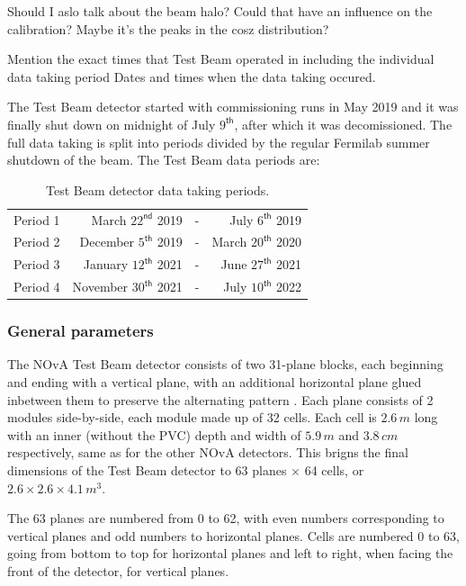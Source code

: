 \documentclass[12pt,a4paper]{article}
\begin{document}
Should I aslo talk about the beam halo? Could that have an influence on the calibration? Maybe it's the peaks in the cosz distribution?

Mention the exact times that Test Beam operated in including the individual data taking period
Dates and times when the data taking occured.

The Test Beam detector started with commissioning runs in May 2019 and it was finally shut down on midnight of July $9^{\textsf{th}}$, after which it was decomissioned. The full data taking is split into periods divided by the regular Fermilab summer shutdown of the beam. The Test Beam data periods are:
\begin{table}[!ht]
\centering
\def\arraystretch{1.4}
\begin{tabular}{l@{\hskip 1in}rcr}
Period 1 & March $22^{\textsf{nd}}$ 2019 & - & July $6^{\textsf{th}}$ 2019\\
Period 2 & December $5^{\textsf{th}}$ 2019 & - & March $20^{\textsf{th}}$ 2020\\
Period 3 & January $12^{\textsf{th}}$ 2021 & - & June $27^{\textsf{th}}$ 2021\\
Period 4 & November $30^{\textsf{th}}$ 2021 & - & July $10^{\textsf{th}}$ 2022
\end{tabular}
\caption{Test Beam detector data taking periods.}
\label{tabTestBeamPeriods}
\end{table}

\subsubsection*{General parameters}
The NOvA Test Beam detector consists of two 31-plane blocks, each beginning and ending with a vertical plane, with an additional horizontal plane glued inbetween them to preserve the alternating pattern \cite{NOVA-doc-29543}. Each plane consists of 2 modules side-by-side, each module made up of 32 cells. Each cell is $2.6\,\unit{m}$ long with an inner (without the PVC) depth and width of $5.9\,\unit{m}$ and $3.8\,\unit{cm}$ respectively, same as for the other NOvA detectors. This brigns the final dimensions of the Test Beam detector to 63 planes $\times$ 64 cells, or $2.6\times 2.6\times 4.1\,\unit{m^3}$.

The 63 planes are numbered from 0 to 62, with even numbers corresponding to vertical planes and odd numbers to horizontal planes. Cells are numbered 0 to 63, going from bottom to top for horizontal planes and left to right, when facing the front of the detector, for vertical planes.
\end{document}
